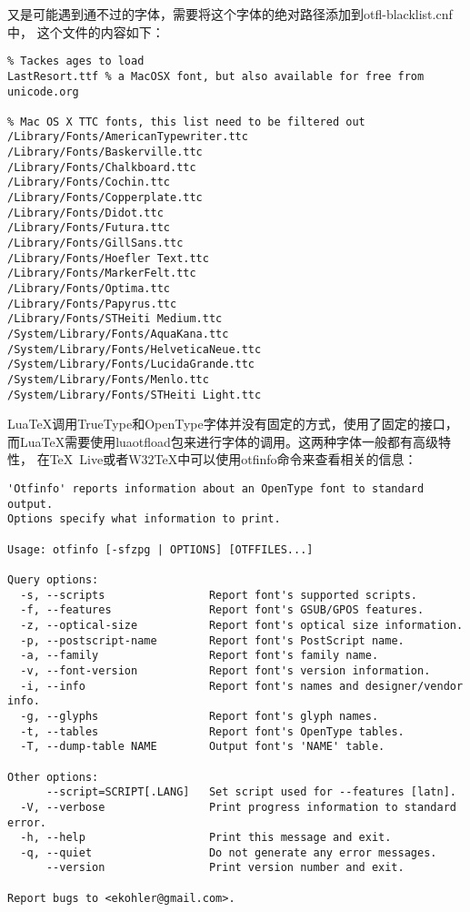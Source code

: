 \documentclass[DIV=13]{article}
\def\XeTeX{\hologo{XeTeX}}
\begin{document}
又是可能遇到通不过的字体，需要将这个字体的绝对路径添加到otfl-blacklist.cnf中，
这个文件的内容如下：
\begin{verbatim}
% Tackes ages to load
LastResort.ttf % a MacOSX font, but also available for free from unicode.org 

% Mac OS X TTC fonts, this list need to be filtered out
/Library/Fonts/AmericanTypewriter.ttc
/Library/Fonts/Baskerville.ttc
/Library/Fonts/Chalkboard.ttc
/Library/Fonts/Cochin.ttc
/Library/Fonts/Copperplate.ttc
/Library/Fonts/Didot.ttc
/Library/Fonts/Futura.ttc
/Library/Fonts/GillSans.ttc
/Library/Fonts/Hoefler Text.ttc
/Library/Fonts/MarkerFelt.ttc
/Library/Fonts/Optima.ttc
/Library/Fonts/Papyrus.ttc
/Library/Fonts/STHeiti Medium.ttc
/System/Library/Fonts/AquaKana.ttc
/System/Library/Fonts/HelveticaNeue.ttc
/System/Library/Fonts/LucidaGrande.ttc
/System/Library/Fonts/Menlo.ttc
/System/Library/Fonts/STHeiti Light.ttc
\end{verbatim}

Lua\TeX 调用TrueType和OpenType字体并没有固定的方式，\XeTeX 使用了固定的接口，
而Lua\TeX 需要使用luaotfload包来进行字体的调用。这两种字体一般都有高级特性，
在\TeX\ Live或者W32\TeX 中可以使用otfinfo命令来查看相关的信息：
\begin{verbatim}
'Otfinfo' reports information about an OpenType font to standard output.
Options specify what information to print.

Usage: otfinfo [-sfzpg | OPTIONS] [OTFFILES...]

Query options:
  -s, --scripts                Report font's supported scripts.
  -f, --features               Report font's GSUB/GPOS features.
  -z, --optical-size           Report font's optical size information.
  -p, --postscript-name        Report font's PostScript name.
  -a, --family                 Report font's family name.
  -v, --font-version           Report font's version information.
  -i, --info                   Report font's names and designer/vendor info.
  -g, --glyphs                 Report font's glyph names.
  -t, --tables                 Report font's OpenType tables.
  -T, --dump-table NAME        Output font's 'NAME' table.

Other options:
      --script=SCRIPT[.LANG]   Set script used for --features [latn].
  -V, --verbose                Print progress information to standard error.
  -h, --help                   Print this message and exit.
  -q, --quiet                  Do not generate any error messages.
      --version                Print version number and exit.

Report bugs to <ekohler@gmail.com>.
\end{verbatim}
\end{document}
